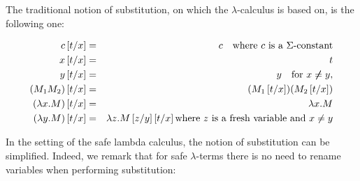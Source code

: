 The traditional notion of substitution, on which the $\lambda$-calculus is based on, is the following one:
\begin{dfn}[Substitution]
\label{va_dfn:subst}
\begin{eqnarray*}
c \left[ t/x \right] &=& c \quad \mbox{where $c$ is a $\Sigma$-constant}\\
x \left[ t/x \right] &=& t\\
 y\left[ t/x \right] &=& y \quad \mbox{for } x \not \neq y,\\
(M_1 M_2) \left[ t/x \right] &=& (M_1 \left[ t/x \right]) (M_2 \left[ t/x \right])\\
(\lambda x . M) \left[ t/x \right] &=& \lambda x . M\\
(\lambda y . M) \left[ t/x \right] &=& \lambda z . M \left[ z/y \right]
\left[ t/x \right] \mbox{where $z$ is a fresh variable and $x\not = y$}
\end{eqnarray*}
\end{dfn}

In the setting of the safe lambda calculus, the notion of substitution can be simplified.
Indeed, we remark that for safe $\lambda$-terms there is no need to rename variables
when performing substitution:

